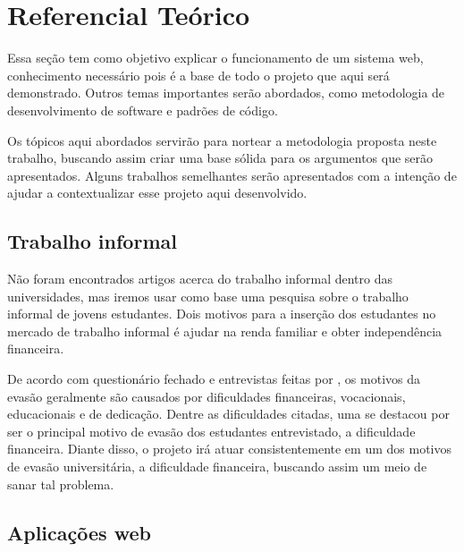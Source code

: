 \chapter{Referencial Teórico}

Essa seção tem como objetivo explicar o funcionamento de um sistema web, conhecimento necessário pois é a base de todo o projeto que aqui será demonstrado. Outros temas importantes serão abordados, como metodologia de desenvolvimento de software e padrões de código. \par
Os tópicos aqui abordados servirão para nortear a metodologia proposta neste trabalho, buscando assim criar uma base sólida para os argumentos que serão apresentados. Alguns trabalhos semelhantes serão apresentados com a intenção de ajudar a contextualizar esse projeto aqui desenvolvido.


\section{Trabalho informal}\label{trabalho_informal}
Não foram encontrados artigos acerca do trabalho informal dentro das universidades, mas iremos usar como base uma pesquisa sobre o trabalho informal de jovens estudantes. Dois motivos para a inserção dos estudantes no mercado de trabalho informal é ajudar na renda familiar e obter independência financeira\cite{ferreira2009trabalhojovem}. \par
De acordo com questionário fechado e entrevistas feitas por \cite{ribeiro2005evasao}, os motivos da evasão geralmente são causados por dificuldades financeiras, vocacionais, educacionais e de dedicação. Dentre as dificuldades citadas, uma se destacou por ser o principal motivo de evasão dos estudantes entrevistado, a dificuldade financeira. Diante disso, o projeto irá atuar consistentemente em um dos motivos de evasão universitária, a dificuldade financeira, buscando assim um meio de sanar tal problema.

\section{Aplicações web}
\label{sec:trabalhos_correlatos}

